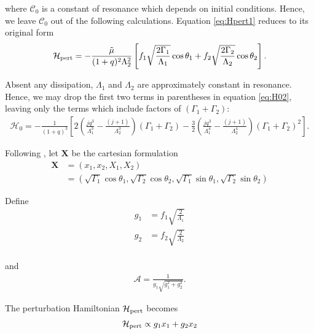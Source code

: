 \documentclass[usenatbib,twocolumn]{mnras}
\renewcommand{\v}[1]{\boldsymbol{ #1 }}
\begin{document}
\noindent
where \(\mathcal C_0\) is a constant of resonance which depends on initial conditions.
Hence, we leave \(\mathcal C_0\) out of the following calculations.
Equation \eqref{eq:Hpert1} reduces to its original form
\begin{align}
\label{eq:H_3}
  \mathcal{H}_{\rm pert}
  =-\frac{\tilde\mu}{(1+q)^2\Lambda_2^2}
  \left[
  f_1\sqrt{\frac{2\Gamma_1}{\Lambda_1}}\cos\theta_1
  +f_2\sqrt{\frac{2\Gamma_2}{\Lambda_2}}\cos\theta_2
  \right].
\end{align}

\noindent Absent any dissipation, \(\Lambda_1\) and
\(\Lambda_2\) are approximately constant in resonance.  Hence, we may
drop the first two terms in parentheses in equation \eqref{eq:H02},
leaving only the terms which include factors of \((\Gamma_1+\Gamma_2)\):
\begin{align}
  \label{eq:H03}
  \mathcal{H}_0
  = -\frac{1}{(1+q)^3}\left[
   2\left(
     \frac{jq^3}{\Lambda_1^3} - \frac{(j+1)}{\Lambda_2^3}
     \right)(\Gamma_1+\Gamma_2)
   -\frac32\left( 
     \frac{jq^3}{\Lambda_1^4} - \frac{(j+1)}{\Lambda_2^4}\right)
     (\Gamma_1+\Gamma_2)^2
     \right].
\end{align}

Following \citet{henrard86_reduc_trans_apocen_librat}
\citep[equivalently, ][]{wisdom_canonical_1986,moutamid14_coupl_between_corot_lindb_reson}, let \(\v X\) be the
cartesian formulation
\begin{align}
  \v X &= (x_1, x_2, X_1, X_2)\nonumber\\
  &= (\sqrt{\Gamma_1}\cos\theta_1, \sqrt{\Gamma_2}\cos\theta_2,
    \sqrt{\Gamma_1}\sin\theta_1, \sqrt{\Gamma_2}\sin\theta_2)
\end{align}

\noindent 
Define
\begin{align}
    g_1 &= f_1\sqrt{\frac{2}{\Lambda_1}} \\
    g_2 &= f_2\sqrt{\frac{2}{\Lambda_2}} \\
\end{align}

\noindent and
\begin{align}
  \mathcal{A} = \frac{1}{g_1\sqrt{g_1^2+g_2^2}}.
\end{align}

\noindent The perturbation Hamiltonian \(\mathcal H_{\rm
pert}\) becomes
\begin{align}
  \mathcal H_{\rm pert} \propto g_1 x_1 + g_2 x_2
\end{align}
\end{document}
